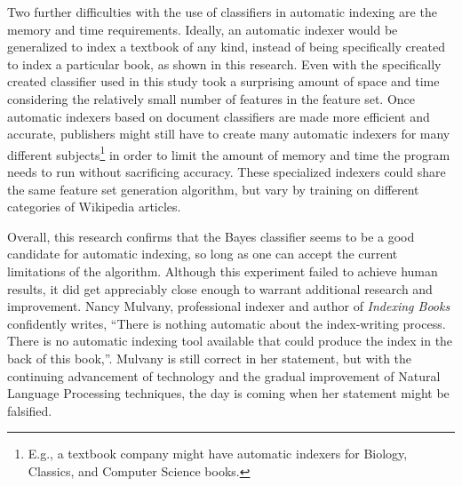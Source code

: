 Two further difficulties with the use of classifiers in automatic indexing are the memory and time requirements.
Ideally, an automatic indexer would be generalized to index a textbook of any kind, instead of being specifically created to index a particular book, as shown in this research.
Even with the specifically created classifier used in this study took a surprising amount of space and time considering the relatively small number of features in the feature set.
Once automatic indexers based on document classifiers are made more efficient and accurate, publishers might still have to create many automatic indexers for many different subjects\footnote{E.g., a textbook company might have automatic indexers for Biology, Classics, and Computer Science books.} in order to limit the amount of memory and time the program needs to run without sacrificing accuracy.
These specialized indexers could share the same feature set generation algorithm, but vary by training on different categories of Wikipedia articles.

Overall, this research confirms that the \naive Bayes classifier seems to be a good candidate for automatic indexing, so long as one can accept the current limitations of the algorithm.
Although this experiment failed to achieve human results, it did get appreciably close enough to warrant additional research and improvement.
Nancy Mulvany, professional indexer and author of {\it Indexing Books} confidently writes, ``There is nothing automatic about the index-writing process.
There is no automatic indexing tool available that could produce the index in the back of this book,''\cite{mulvany}.
Mulvany is still correct in her statement, but with the continuing advancement of technology and the gradual improvement of Natural Language Processing techniques, the day is coming when her statement might be falsified.
